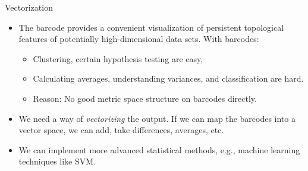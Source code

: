 \documentclass[usenames,dvipsnames,aspectratio=1610]{beamer}
\begin{document}
\begin{frame}{Vectorization}
  \begin{itemize}
    \item The barcode provides a convenient visualization of persistent topological
      features of potentially high-dimensional data sets. With barcodes:
      \begin{itemize}
	\item Clustering, certain hypothesis testing are {\color{blue} easy},
	\item Calculating averages, understanding variances, and classification are {\color{red}
	  hard}.
	\item {\color{green} Reason:} No good metric space structure on barcodes directly.
      \end{itemize}
    \item We need a way of {\em vectorizing} the output. If we can map the barcodes into
      a vector space, we can add, take differences, averages, etc. 
    \item We can implement more advanced statistical methods, e.g., machine learning
      techniques like SVM.
  \end{itemize}
\end{frame}
\end{document}
